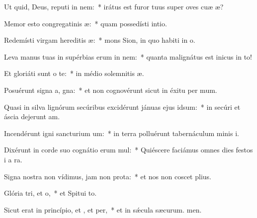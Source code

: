 \item Ut quid, Deus, reputi in nem:~* irátus est furor tuus super oves cuæ æ?
\item Memor esto congregatinis æ:~* quam possedísti  intio.
\item Redemísti virgam hereditis æ:~* mons Sion, in quo habiti in o.
\item Leva manus tuas in supérbias erum in nem:~* quanta malignátus est inicus in to!
\item Et gloriáti sunt  o te:~* in médio solemnitis æ.
\item Posuérunt signa a, gna:~* et non cognovérunt sicut in éxitu per mum.
\item Quasi in silva lignórum secúribus excidérunt jánuas ejus  idsum:~* in secúri et áscia dejerunt am.
\item Incendérunt igni sancturium um:~* in terra polluérunt tabernáculum minis i.
\item Dixérunt in corde suo cognátio erum mul:~* Quiéscere faciámus omnes dies festos i a ra.
\item Signa nostra non vídimus, jam non  prota:~* et nos non coscet plius.
\item Glória tri, et o,~* et Spitui to.
\item Sicut erat in princípio, et , et per,~* et in sǽcula sæcurum. men.
